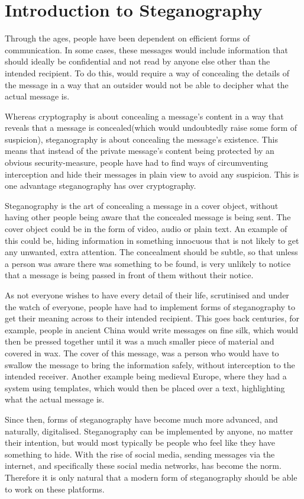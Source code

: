 \section{Introduction to Steganography}
Through the ages, people have been dependent on efficient forms of communication. In some cases, these messages would include information that should ideally be confidential and not read by anyone else other than the intended recipient. To do this, would require a way of concealing the details of the message in a way that an outsider would not be able to decipher what the actual message is.

Whereas cryptography is about concealing a message's content in a way that reveals that a message is concealed(which would undoubtedly raise some form of suspicion), steganography is about concealing the message's existence. This means that instead of the private message's content being protected by an obvious security-measure, people have had to find ways of circumventing interception and hide their messages in plain view to avoid any suspicion. This is one advantage steganography has over cryptography. 

Steganography is the art of concealing a message in a cover object, without having other people being aware that the concealed message is being sent\citep{Anderson1998}. The cover object could be in the form of video, audio or plain text. An example of this could be, hiding information in something innocuous that is not likely to get any unwanted, extra attention. The concealment should be subtle, so that unless a person was aware there was something to be found, is very unlikely to notice that a message is being passed in front of them without their notice.

As not everyone wishes to have every detail of their life, scrutinised and under the watch of everyone, people have had to implement forms of steganography to get their meaning across to their intended recipient. This goes back centuries, for example, people in ancient China would write messages on fine silk, which would then be pressed together until it was a much smaller piece of material and covered in wax. The cover of this message, was a person who would have to swallow the message to bring the information safely, without interception to the intended receiver\citep{Singh2001}. Another example being medieval Europe, where they had a system using templates, which would then be placed over a text, highlighting what the actual message is\citep{Anderson1998}.

Since then, forms of steganography have become much more advanced, and naturally, digitalised. Steganography can be implemented by anyone, no matter their intention, but would most typically be people who feel like they have something to hide. With the rise of social media, sending messages via the internet, and specifically these social media networks, has become the norm. Therefore it is only natural that a modern form of steganography should be able to work on these platforms. 
